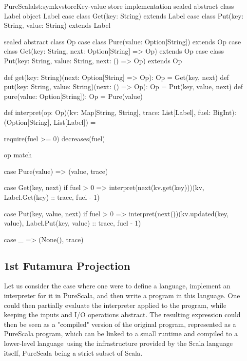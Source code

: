 \documentclass[a4paper,twoside]{article}
\begin{document}
\begin{landscape}
\begin{Code}{PureScala}{lst:symkvstore}{Key-value store implementation}
sealed abstract class Label
object Label {
  case class Get(key: String)                extends Label
  case class Put(key: String, value: String) extends Label
}

sealed abstract class Op
case class Pure(value: Option[String])                     extends Op
case class Get(key: String, next: Option[String] => Op)    extends Op
case class Put(key: String, value: String, next: () => Op) extends Op

def get(key: String)(next: Option[String] => Op): Op    = Get(key, next)
def put(key: String, value: String)(next: () => Op): Op = Put(key, value, next)
def pure(value: Option[String]): Op                     = Pure(value)

def interpret(op: Op)(kv: Map[String, String], trace: List[Label], fuel: BigInt): (Option[String], List[Label]) = {
  require(fuel >= 0)
  decreases(fuel)

  op match {
    case Pure(value) =>
      (value, trace)

    case Get(key, next) if fuel > 0 =>
      interpret(next(kv.get(key)))(kv, Label.Get(key) :: trace, fuel - 1)

    case Put(key, value, next) if fuel > 0 =>
      interpret(next())(kv.updated(key, value), Label.Put(key, value) :: trace, fuel - 1)

    case _ =>
      (None(), trace)
  }
}
\end{Code}
\end{landscape}

\subsection{1st Futamura Projection}

Let us consider the case where one were to define a language, implement an interpreter for it in PureScala, and then write a program in this language. One could then partially evaluate the interpreter applied to the program, while keeping the inputs and I/O operations abstract. The resulting expression could then be seen as a "compiled" version of the original program, represented as a PureScala program, which can be linked to a small runtime and compiled to a lower-level language using the infrastructure provided by the Scala language itself, PureScala being a strict subset of Scala.\\
\end{document}
